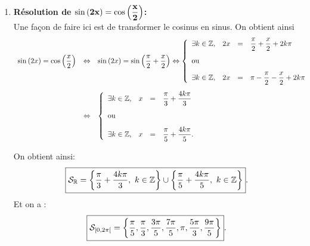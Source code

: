 \documentclass[a4paper, 11pt]{article}
\begin{document}
\begin{correction}
\begin{enumerate}
\begin{minipage}[c]{0.45\textwidth}
\begin{center}
\end{center}
\end{minipage}
\item \textbf{R\'esolution de $\mathbf{\sin{(2x)}=\cos{\left(\displaystyle\frac{x}{2}\right)}}$:}\\
\noindent Une fa\c{c}on de faire ici est de transformer le cosinus en sinus. On obtient ainsi
$$\begin{array}{lll}\sin{(2x)}=\cos{\left(\ddp\frac{x}{2}\right)} &\Leftrightarrow &\sin{(2x)}=\sin{\left(\ddp\frac{\pi}{2}+\ddp\frac{x}{2}\right)} \Leftrightarrow \left\lbrace\begin{array}{llll}  \exists k\in\Z,& 2x&=& \ddp\frac{\pi}{2}+\ddp\frac{x}{2}+2k\pi\vsec\\ \hbox{ou}\vsec\\ \exists k\in\Z,& 2x&=&\pi-\ddp\frac{\pi}{2}-\ddp\frac{x}{2}+2k\pi    \end{array}\right. \vsec\\
&\Leftrightarrow & \left\lbrace\begin{array}{llll}  \exists k\in\Z,& x&=& \ddp\frac{\pi}{3}+\ddp\frac{4k\pi}{3}\vsec\\ \hbox{ou}\vsec\\ \exists k\in\Z,& x&=& \ddp\frac{\pi}{5}+\ddp\frac{4k\pi}{5}.    \end{array}\right.\end{array}$$
 \begin{minipage}[c]{0.45\textwidth}
On obtient ainsi:
$$\fbox{$\mathcal{S}_{\R}=\left\lbrace  \ddp\frac{\pi}{3}+\ddp\frac{4k\pi}{3} ,\ k\in\Z\right\rbrace\cup\left\lbrace  \ddp\frac{\pi}{5}+\ddp\frac{4k\pi}{5},\ k\in\Z\right\rbrace$}.$$
Et on a :
$$\fbox{$\mathcal{S}_{\lbrack 0,2\pi\lbrack}=\left\lbrace 
\displaystyle\frac{\pi}{5},\displaystyle\frac{\pi}{3},\displaystyle\frac{3\pi}{5},\displaystyle\frac{7\pi}{5},\pi,\displaystyle\frac{5\pi}{3},\displaystyle\frac{9\pi}{5}\right\rbrace$}.$$

\end{minipage}
\end{enumerate}
\end{correction}
\end{document}
